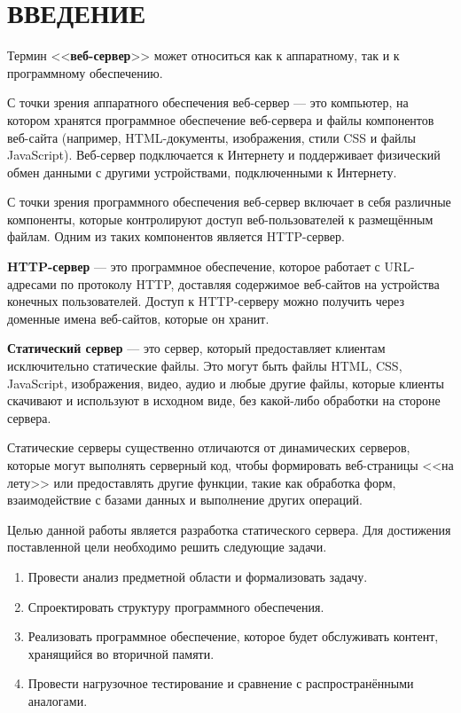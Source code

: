 \part*{ВВЕДЕНИЕ}

Термин <<\textbf{веб-сервер}>> \cite{web_server} может относиться как к аппаратному, так и к программному обеспечению.

С точки зрения аппаратного обеспечения веб-сервер --- это компьютер, на котором хранятся программное обеспечение веб-сервера и файлы компонентов веб-сайта (например, HTML-документы, изображения, стили CSS и файлы JavaScript). Веб-сервер подключается к Интернету и поддерживает физический обмен данными с другими устройствами, подключенными к Интернету. \cite{web_server}

С точки зрения программного обеспечения веб-сервер включает в себя различные компоненты, которые контролируют доступ веб-пользователей к размещённым файлам. Одним из таких компонентов является HTTP-сервер. \cite{web_server}

\textbf{HTTP-сервер} \cite{web_server} --- это программное обеспечение, которое работает с URL-адресами по протоколу HTTP, доставляя содержимое веб-сайтов на устройства конечных пользователей. Доступ к HTTP-серверу можно получить через доменные имена веб-сайтов, которые он хранит.

\textbf{Статический сервер} --- это сервер, который предоставляет клиентам исключительно статические файлы. Это могут быть файлы HTML, CSS, JavaScript, изображения, видео, аудио и любые другие файлы, которые клиенты скачивают и используют в исходном виде, без какой-либо обработки на стороне сервера. \cite{web_server}

Статические серверы существенно отличаются от динамических серверов, которые могут выполнять серверный код, чтобы формировать веб-страницы <<на лету>> или предоставлять другие функции, такие как обработка форм, взаимодействие с базами данных и выполнение других операций. \cite{web_server}

Целью данной работы является разработка статического сервера. Для достижения поставленной цели необходимо решить следующие задачи.

\begin{enumerate}[label*=\arabic*.]
	\item Провести анализ предметной области и формализовать задачу.
	\item Спроектировать структуру программного обеспечения.
	\item Реализовать программное обеспечение, которое будет обслуживать контент, хранящийся во вторичной памяти. 
	\item Провести нагрузочное тестирование и сравнение с распространёнными аналогами.
\end{enumerate}